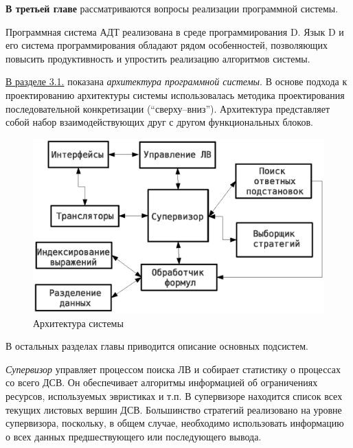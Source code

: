 \documentclass[a4paper]{report}
\begin{document}

\textbf{В третьей главе} рассматриваются вопросы реализации программной системы.

Программная система АДТ реализована в среде программирования D. Язык D и его система программирования обладают рядом особенностей, позволяющих повысить продуктивность и упростить реализацию алгоритмов системы.

\underline{В разделе 3.1.} показана \emph{архитектура программной системы}. В основе подхода к проектированию архитектуры системы использовалась методика проектирования последовательной конкретизации (``сверху--вниз''). Архитектура представляет собой набор взаимодействующих друг с другом функциональных блоков.
\begin{figure}[htb]
    \centering
    \includegraphics[width=0.6\linewidth]{pics/Design1.eps}
    \caption{Архитектура системы}
    \label{fig:design1}
\end{figure}

В остальных разделах главы приводится описание основных подсистем.

\emph{Супервизор} управляет процессом поиска ЛВ и собирает статистику о процессах со всего ДСВ. Он обеспечивает алгоритмы информацией об ограничениях ресурсов, используемых эвристиках и т.п. В супервизоре находится список всех текущих листовых вершин ДСВ. Большинство стратегий реализовано на уровне супервизора, поскольку, в общем случае, необходимо использовать информацию о всех данных предшествующего или последующего вывода.
\end{document}
